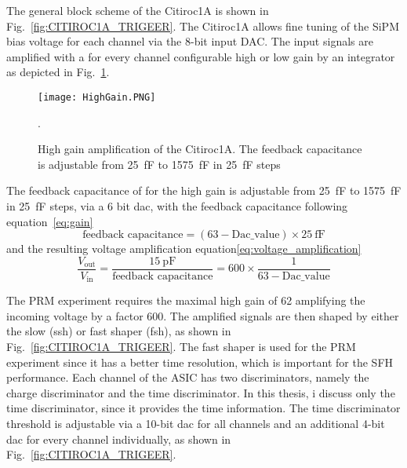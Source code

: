 The general block scheme of the Citiroc1A is shown in Fig.~\ref{fig:CITIROC1A_TRIGEER}.
\newline
The Citiroc1A allows fine tuning of the SiPM bias voltage for each channel via the 8-bit input DAC.
\newline	
The input signals are amplified with a for every channel configurable high or low gain by an integrator as depicted in Fig.~\ref{HighGain}.
\begin{figure}[h]
    \centering
    \texttt{[image: HighGain.PNG]}
    \caption{High gain amplification of the Citiroc1A. The feedback capacitance is adjustable from \SI{25}{\femto\farad} to \SI{1575}{\femto\farad} in \SI{25}{\femto\farad} steps\autocite{datasheetCITIROC}}.
    \label{HighGain}
\end{figure}
The feedback capacitance of for the high gain is adjustable from \SI{25}{\femto\farad} to \SI{1575}{\femto\farad} in \SI{25}{\femto\farad} steps, via a 6 bit dac, with the feedback capacitance following equation~\ref{eq:gain}
\begin{equation}
    \text{feedback capacitance} = (63 - \text{Dac\_value}) \times \SI{25}{\femto\farad}
    \label{eq:gain}
\end{equation}
and the resulting voltage amplification equation\ref{eq:voltage_amplification} 
\begin{equation}
    \frac{V_{\text{out}}}{V_{\text{in}}} = \frac{\SI{15}{\pico\farad}}{\text{feedback capacitance}} = 600 \times \frac{1}{63 - \text{Dac\_value}}
       \label{eq:voltage_amplification}
   \end{equation}
\autocite{datasheetCITIROC}

The PRM experiment requires the maximal high gain of 62 amplifying the incoming voltage by a factor 600\autocite{InternalcommunicationIgor}.
\newline
The amplified signals are then shaped by either the slow (ssh) or fast shaper (fsh), as shown in Fig.~\ref{fig:CITIROC1A_TRIGEER}. 
The fast shaper is used for the PRM experiment since it has a better time resolution, which is important for the SFH performance\autocite{datasheetCITIROC}.
\newline
Each channel of the ASIC has two discriminators, namely the charge discriminator and the time discriminator. In this thesis, i discuss only the time discriminator,
since it provides the time information.
The time discriminator threshold is adjustable via a 10-bit dac for all channels and an additional 4-bit dac for every channel individually, as shown in Fig.~\ref{fig:CITIROC1A_TRIGEER}\autocite{datasheetCITIROC}.

